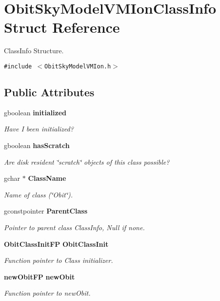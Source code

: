 \section{Obit\-Sky\-Model\-VMIon\-Class\-Info Struct Reference}
\label{structObitSkyModelVMIonClassInfo}
Class\-Info Structure.  


{\tt \#include $<$Obit\-Sky\-Model\-VMIon.h$>$}

\subsection*{Public Attributes}
\begin{CompactItemize}
\item 
gboolean {\bf initialized}
\begin{CompactList}\small\item\em Have I been initialized? \item\end{CompactList}\item 
gboolean {\bf has\-Scratch}
\begin{CompactList}\small\item\em Are disk resident \char`\"{}scratch\char`\"{} objects of this class possible? \item\end{CompactList}\item 
gchar $\ast$ {\bf Class\-Name}
\begin{CompactList}\small\item\em Name of class (\char`\"{}Obit\char`\"{}). \item\end{CompactList}\item 
gconstpointer {\bf Parent\-Class}
\begin{CompactList}\small\item\em Pointer to parent class Class\-Info, Null if none. \item\end{CompactList}\item 
{\bf Obit\-Class\-Init\-FP} {\bf Obit\-Class\-Init}
\begin{CompactList}\small\item\em Function pointer to Class initializer. \item\end{CompactList}\item 
{\bf new\-Obit\-FP} {\bf new\-Obit}
\begin{CompactList}\small\item\em Function pointer to new\-Obit. \item\end{CompactList}\item 

\end{CompactItemize}

